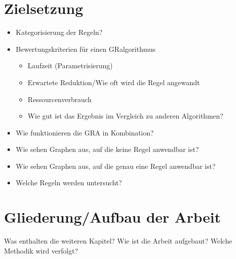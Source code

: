 \section{Zielsetzung}
\label{ch:Einleitung:sec:Zielsetzung}

\begin{itemize}
\item Kategorisierung der Regeln?
\item Bewertungskriterien für einen GRalgorithmus
	\begin{itemize}
	\item Laufzeit (Parametrisierung)
	\item Erwartete Reduktion/Wie oft wird die Regel angewandt
	\item Ressourcenverbrauch
	\item Wie gut ist das Ergebnis im Vergleich zu anderen Algorithmen?	
	\end{itemize}
\item Wie funktionieren die GRA in Kombination?
\item Wie sehen Graphen aus, auf die keine Regel anwendbar ist?
\item Wie sehen Graphen aus, auf die genau eine Regel anwendbar ist?
\item Welche Regeln werden untersucht?
\end{itemize}


\section{Gliederung/Aufbau der Arbeit}
\label{ch:Einleitung:sec:Gliederung}

Was enthalten die weiteren Kapitel? Wie ist die Arbeit aufgebaut? Welche Methodik wird verfolgt?


